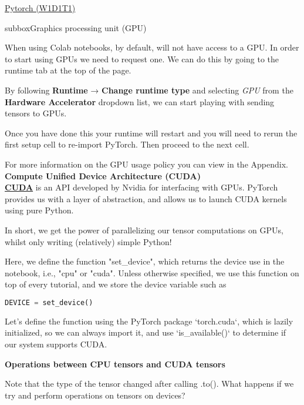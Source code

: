 \begin{multicols}{3}
\begin{textbox}{\href{https://deeplearning.neuromatch.io/tutorials/W1D1_BasicsAndPytorch/student/W1D1_Tutorial1.html}{Pytorch (W1D1T1) }}
\begin{subbox}{subbox}{Graphics processing unit (GPU)}
\scriptsize

When using Colab notebooks, by default, will not have access to a GPU. In order to start using GPUs we need to request one. We can do this by going to the runtime tab at the top of the page. 

By following \textbf{Runtime} → \textbf{Change runtime type} and selecting \textit{GPU} from the \textbf{Hardware Accelerator} dropdown list, we can start playing with sending tensors to GPUs.

Once you have done this your runtime will restart and you will need to rerun the first setup cell to re-import PyTorch. Then proceed to the next cell.

For more information on the GPU usage policy you can view in the Appendix.\\

\textbf{Compute Unified Device Architecture (CUDA)}\\

\href{(https://developer.nvidia.com/cuda-toolkit)}{\textbf{CUDA}} is an API developed by Nvidia for interfacing with GPUs. PyTorch provides us with a layer of abstraction, and allows us to launch CUDA kernels using pure Python.

In short, we get the power of parallelizing our tensor computations on GPUs, whilst only writing (relatively) simple Python!

Here, we define the function "set\_device", which returns the device use in the notebook, i.e., "cpu" or "cuda". Unless otherwise specified, we use this function on top of every tutorial, and we store the device variable such as

\begin{lstlisting}[language=Python]
DEVICE = set_device()
\end{lstlisting}

Let's define the function using the PyTorch package `torch.cuda`, which is lazily initialized, so we can always import it, and use `is\_available()` to determine if our system supports CUDA.

\textbf{Operations between CPU tensors and CUDA tensors}

Note that the type of the tensor changed after calling .to(). What happens if we try and perform operations on tensors on devices?


\end{subbox}
\end{textbox}
\end{multicols}
